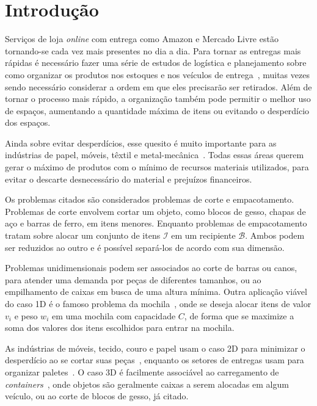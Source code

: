 \chapter*[Introdução]{Introdução}\label{ch:introducao}

Serviços de loja \textit{online} com entrega como Amazon e Mercado Livre estão tornando-se cada vez
mais presentes no dia a dia.
Para tornar as entregas mais rápidas é necessário fazer uma série de estudos de logística e
planejamento sobre como organizar os produtos nos estoques e nos veículos de entrega~\cite{
    silva2022integer,morabito1992abordagem}, muitas vezes sendo necessário considerar a ordem
em que eles precisarão ser retirados.
Além de tornar o processo mais rápido, a organização também pode permitir o melhor uso de espaços,
aumentando a quantidade máxima de itens ou evitando o desperdício dos espaços.

Ainda sobre evitar desperdícios, esse quesito é muito importante para as indústrias de papel,
móveis, têxtil e metal-mecânica~\cite{queiroz2022estudo,cavali2004problemas,belluzzo2005otimizacao}.
Todas essas áreas querem gerar o máximo de produtos com o mínimo de recursos materiais utilizados,
para evitar o descarte desnecessário do material e prejuízos financeiros.

Os problemas citados são considerados problemas de corte e empacotamento.
Problemas de corte envolvem cortar um objeto, como blocos de gesso, chapas de aço e barras de ferro,
em itens menores.
Enquanto problemas de empacotamento tratam sobre alocar um conjunto de itens $\mathcal{I}$ em um
recipiente $\mathcal{B}$.
Ambos podem ser reduzidos ao outro e é possível separá-los de acordo com sua dimensão.

Problemas unidimensionais podem ser associados ao corte de barras ou canos, para atender uma
demanda por peças de diferentes tamanhos, ou ao empilhamento de caixas em busca de uma altura mínima.
Outra aplicação viável do caso 1D é o famoso problema da mochila~\cite{exact-solution-techniques},
onde se deseja alocar itens de valor $v_i$ e peso $w_i$ em uma mochila com capacidade $C$,
de forma que se maximize a soma dos valores dos itens escolhidos para entrar na mochila.

As indústrias de móveis, tecido, couro e papel usam o caso 2D para minimizar o desperdício ao se
cortar suas peças~\cite{queiroz2022estudo, cavali2004problemas, belluzzo2005otimizacao},
enquanto os setores de entregas usam para organizar paletes~\cite{morabito1992abordagem}.
O caso 3D é facilmente associável ao carregamento de \textit{containers}~\cite{morabito1992abordagem},
onde objetos são geralmente caixas a serem alocadas em algum veículo, ou ao corte de blocos de
gesso, já citado.

